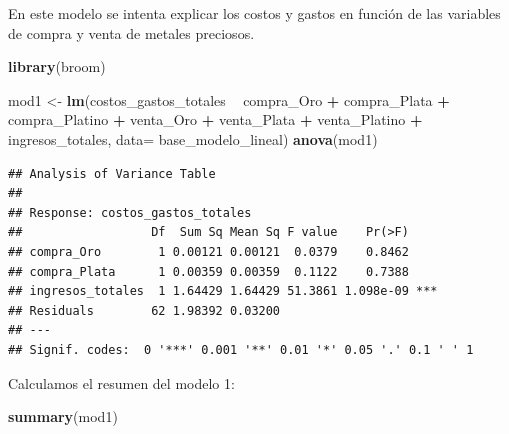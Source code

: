 \documentclass[
  11pt,
  a4paper,
]{book}
\newenvironment{Shaded}{\begin{snugshade}}{\end{snugshade}}
\newcommand{\DataTypeTok}[1]{\textcolor[rgb]{0.13,0.29,0.53}{#1}}
\newcommand{\KeywordTok}[1]{\textcolor[rgb]{0.13,0.29,0.53}{\textbf{#1}}}
\newcommand{\NormalTok}[1]{#1}
\newcommand{\OperatorTok}[1]{\textcolor[rgb]{0.81,0.36,0.00}{\textbf{#1}}}
\newcommand{\StringTok}[1]{\textcolor[rgb]{0.31,0.60,0.02}{#1}}
\begin{document}
En este modelo se intenta explicar los costos y gastos en función de las
variables de compra y venta de metales preciosos.

\begin{Shaded}
\begin{Highlighting}[]
\KeywordTok{library}\NormalTok{(broom)}

\NormalTok{mod1 <-}\StringTok{ }\KeywordTok{lm}\NormalTok{(costos_gastos_totales }\OperatorTok{~}\StringTok{  }\NormalTok{compra_Oro }\OperatorTok{+}\StringTok{ }\NormalTok{compra_Plata }\OperatorTok{+}\StringTok{ }\NormalTok{compra_Platino }\OperatorTok{+}\StringTok{ }
\StringTok{        }\NormalTok{venta_Oro }\OperatorTok{+}\StringTok{ }\NormalTok{venta_Plata }\OperatorTok{+}\StringTok{ }\NormalTok{venta_Platino }\OperatorTok{+}\StringTok{ }\NormalTok{ingresos_totales, }
        \DataTypeTok{data=}\NormalTok{ base_modelo_lineal) }
\KeywordTok{anova}\NormalTok{(mod1)}
\end{Highlighting}
\end{Shaded}

\begin{verbatim}
## Analysis of Variance Table
## 
## Response: costos_gastos_totales
##                  Df  Sum Sq Mean Sq F value    Pr(>F)    
## compra_Oro        1 0.00121 0.00121  0.0379    0.8462    
## compra_Plata      1 0.00359 0.00359  0.1122    0.7388    
## ingresos_totales  1 1.64429 1.64429 51.3861 1.098e-09 ***
## Residuals        62 1.98392 0.03200                      
## ---
## Signif. codes:  0 '***' 0.001 '**' 0.01 '*' 0.05 '.' 0.1 ' ' 1
\end{verbatim}

Calculamos el resumen del modelo 1:

\begin{Shaded}
\begin{Highlighting}[]
\KeywordTok{summary}\NormalTok{(mod1)}
\end{Highlighting}
\end{Shaded}
\end{document}
